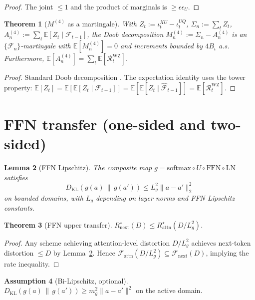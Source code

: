 \documentclass[11pt]{article}
\newcommand{\E}{\mathbb{E}}
\newcommand{\F}{\mathcal{F}}
\newcommand{\Fhat}{\hat{\F}}
\newcommand{\KL}[2]{D_{\mathrm{KL}}(#1 \,\|\, #2)}
\theoremstyle{plain}
\newtheorem{theorem}{Theorem}[section]
\newtheorem{lemma}[theorem]{Lemma}
\theoremstyle{definition}
\newtheorem{assumption}[theorem]{Assumption}
\theoremstyle{remark}
\begin{document}
\begin{proof}
The joint $\leq 1$ and the product of marginals is $\geq \epsilon\epsilon_U$.
\end{proof}

\begin{theorem}[$M^{(4)}$ as a martingale]\label{thm:M4-app}
With $Z_t := \iota_t^{XU} - \iota_t^{UQ}$, $\Sigma_n := \sum_t Z_t$,
$A_n^{(4)} := \sum_t \E[Z_t \mid \F_{t-1}]$, the Doob decomposition
$M_n^{(4)} := \Sigma_n - A_n^{(4)}$ is an $\{\F_n\}$-martingale with
$\E[M_n^{(4)}] = 0$ and increments bounded by $4B_\iota$ a.s.
Furthermore, $\E[A_n^{(4)}] = \sum_t \E[\mathcal{R}_t^{\mathrm{WZ}}]$.
\end{theorem}

\begin{proof}
Standard Doob decomposition \citep[Ch.~12]{williams1991probability}.
The expectation identity uses the tower property:
$\E[Z_t] = \E[\E[Z_t \mid \F_{t-1}]] = \E[\E[Z_t \mid \Fhat_{t-1}]]
= \E[\mathcal{R}_t^{\mathrm{WZ}}]$.
\end{proof}

\section{FFN transfer (one-sided and two-sided)}\label{app:ffn}

\begin{lemma}[FFN Lipschitz]\label{lem:ffn-lipschitz-app}
The composite map
$g = \mathrm{softmax} \circ U \circ \mathrm{FFN} \circ \mathrm{LN}$ satisfies
\[
\KL{g(a)}{g(a')} \leq L_g^2 \|a - a'\|_2^2
\]
on bounded domains, with $L_g$ depending on layer norms and FFN
Lipschitz constants.
\end{lemma}

\begin{theorem}[FFN upper transfer]\label{thm:ffn-upper-app}
$R^\star_{\mathrm{next}}(D) \leq R^\star_{\mathrm{attn}}(D / L_g^2)$.
\end{theorem}

\begin{proof}
Any scheme achieving attention-level distortion $D/L_g^2$ achieves
next-token distortion $\leq D$ by Lemma~\ref{lem:ffn-lipschitz-app}.
Hence $\mathcal{F}_{\mathrm{attn}}(D/L_g^2) \subseteq \mathcal{F}_{\mathrm{next}}(D)$,
implying the rate inequality.
\end{proof}

\begin{assumption}[Bi-Lipschitz, optional]\label{ass:bilipschitz-app}
$\KL{g(a)}{g(a')} \geq m_g^2 \|a-a'\|^2$ on the active domain.
\end{assumption}
\end{document}
